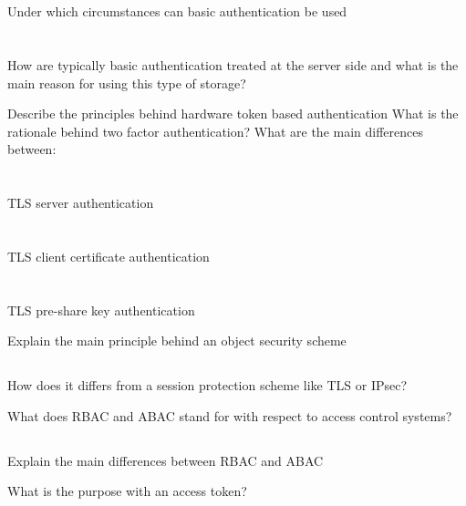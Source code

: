 \begin{questions}
\begin{parts}
  \part{} Under which circumstances can basic authentication be used
  \part{} How are typically basic authentication treated at the server side and what is the main reason for using this type of storage?
  \end{parts}

\question{} Describe the principles behind hardware token based authentication
\question{} What is the rationale behind two factor authentication?
\question{} What are the main differences between:
  \begin{parts}
  \part{} TLS server authentication
  \part{} TLS client certificate authentication
  \part{} TLS pre-share key authentication
  \end{parts}

\question{} Explain the main principle behind an object security scheme
  \begin{parts}
  \part{} How does it differs from a session protection scheme like TLS or IPsec?
  \end{parts}

\question{} What does RBAC and ABAC stand for with respect to access control systems?
  \begin{parts}
  \part{} Explain the main differences between RBAC and ABAC
  \end{parts}

\question{} What is the purpose with an access token?
  \begin{parts}

\end{parts}
\end{questions}
